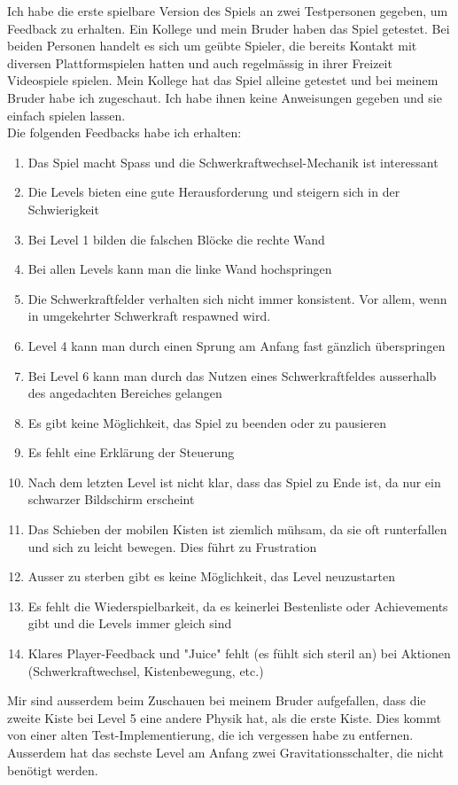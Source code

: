 \documentclass{article}
\begin{document}
Ich habe die erste spielbare Version des Spiels an zwei Testpersonen gegeben, um Feedback zu erhalten. Ein Kollege und mein Bruder haben das Spiel getestet.
Bei beiden Personen handelt es sich um geübte Spieler, die bereits Kontakt mit diversen Plattformspielen hatten und auch regelmässig in ihrer Freizeit Videospiele spielen.
Mein Kollege hat das Spiel alleine getestet und bei meinem Bruder habe ich zugeschaut. Ich habe ihnen keine Anweisungen gegeben und sie einfach spielen lassen.
\\
Die folgenden Feedbacks habe ich erhalten:
\begin{enumerate}
    \item Das Spiel macht Spass und die Schwerkraftwechsel-Mechanik ist interessant
    \item Die Levels bieten eine gute Herausforderung und steigern sich in der Schwierigkeit
    \item Bei Level 1 bilden die falschen Blöcke die rechte Wand
    \item Bei allen Levels kann man die linke Wand hochspringen
    \item Die Schwerkraftfelder verhalten sich nicht immer konsistent. Vor allem, wenn in umgekehrter Schwerkraft respawned wird.
    \item Level 4 kann man durch einen Sprung am Anfang fast gänzlich überspringen
    \item Bei Level 6 kann man durch das Nutzen eines Schwerkraftfeldes ausserhalb des angedachten Bereiches gelangen
    \item Es gibt keine Möglichkeit, das Spiel zu beenden oder zu pausieren
    \item Es fehlt eine Erklärung der Steuerung
    \item Nach dem letzten Level ist nicht klar, dass das Spiel zu Ende ist, da nur ein schwarzer Bildschirm erscheint
    \item Das Schieben der mobilen Kisten ist ziemlich mühsam, da sie oft runterfallen und sich zu leicht bewegen. Dies führt zu Frustration
    \item Ausser zu sterben gibt es keine Möglichkeit, das Level neuzustarten
    \item Es fehlt die Wiederspielbarkeit, da es keinerlei Bestenliste oder Achievements gibt und die Levels immer gleich sind
    \item Klares Player-Feedback und "Juice" fehlt (es fühlt sich steril an) bei Aktionen (Schwerkraftwechsel, Kistenbewegung, etc.)
\end{enumerate}
\bigskip
Mir sind ausserdem beim Zuschauen bei meinem Bruder aufgefallen, dass die zweite Kiste bei Level 5 eine andere Physik hat, als die erste Kiste. Dies kommt von einer
alten Test-Implementierung, die ich vergessen habe zu entfernen. Ausserdem hat das sechste Level am Anfang zwei Gravitationsschalter, die nicht benötigt werden.
\end{document}
